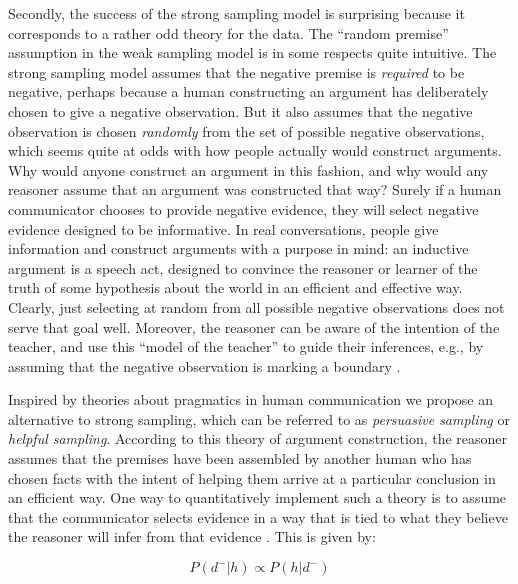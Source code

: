 \documentclass[authoryear,11pt]{elsarticle}
\begin{document}
Secondly, the success of the strong sampling model is surprising because it corresponds to a rather odd theory for the data. The ``random premise'' assumption in the weak sampling model is in some respects quite intuitive. The strong sampling model assumes that the negative premise is {\it required} to be negative, perhaps because a human constructing an argument has deliberately chosen to give a negative observation. But it also assumes that the negative observation is chosen {\it randomly} from the set of possible negative observations, which seems quite at odds with how people actually would construct arguments. Why would anyone construct an argument in this fashion, and why would any reasoner assume that an argument was constructed that way? Surely if a human communicator chooses to provide negative evidence, they will select negative evidence designed to be informative. In real conversations, people give information and construct arguments with a purpose in mind: an inductive argument is a speech act, designed to convince the reasoner or learner of the truth of some hypothesis about the world in an efficient and effective way. Clearly, just selecting at random from all possible negative observations does not serve that goal well. Moreover, the reasoner can be aware of the intention of the teacher, and use this ``model of the teacher'' to guide their inferences, e.g., by assuming that the negative observation is marking a boundary \citep{Levinson1995, SperberWilson1995}.

Inspired by theories about pragmatics in human communication \citep{Grice1989, Levinson1995, FrankGoodman2012} we propose an alternative to strong sampling, which can be referred to as {\it persuasive sampling} or {\it helpful sampling}. According to this theory of argument construction, the reasoner assumes that the premises have been assembled by another human who has chosen facts with the intent of helping them arrive at a particular conclusion in an efficient way. One way to quantitatively implement such a theory is to assume that the communicator selects evidence in a way that is tied to what they believe the reasoner will infer from that evidence \citep[see][]{Shaftoetal2014}. This is given by:

\begin{equation}
P(d^-|h) \propto P(h|d^-)
\label{eq:informative}
\end{equation}
\end{document}
